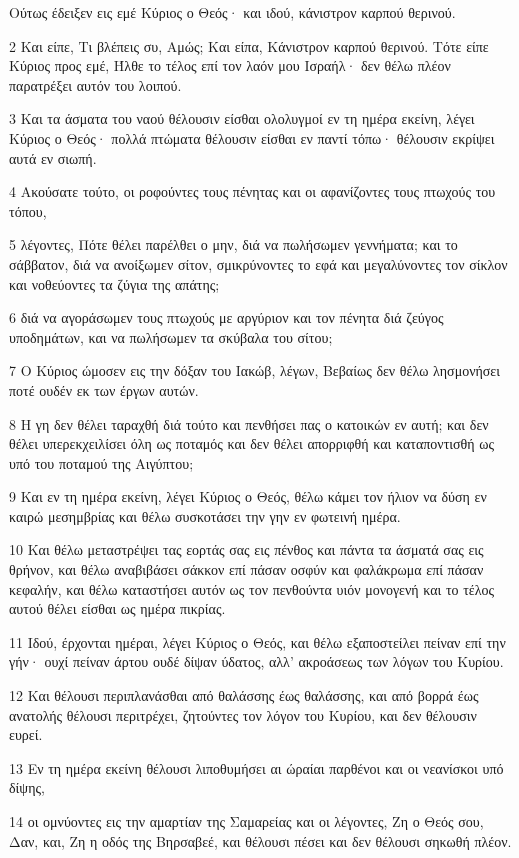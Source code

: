 \par Ούτως έδειξεν εις εμέ Κύριος ο Θεός· και ιδού, κάνιστρον καρπού θερινού.
\par 2 Και είπε, Τι βλέπεις συ, Αμώς; Και είπα, Κάνιστρον καρπού θερινού. Τότε είπε Κύριος προς εμέ, Ήλθε το τέλος επί τον λαόν μου Ισραήλ· δεν θέλω πλέον παρατρέξει αυτόν του λοιπού.
\par 3 Και τα άσματα του ναού θέλουσιν είσθαι ολολυγμοί εν τη ημέρα εκείνη, λέγει Κύριος ο Θεός· πολλά πτώματα θέλουσιν είσθαι εν παντί τόπω· θέλουσιν εκρίψει αυτά εν σιωπή.
\par 4 Ακούσατε τούτο, οι ροφούντες τους πένητας και οι αφανίζοντες τους πτωχούς του τόπου,
\par 5 λέγοντες, Πότε θέλει παρέλθει ο μην, διά να πωλήσωμεν γεννήματα; και το σάββατον, διά να ανοίξωμεν σίτον, σμικρύνοντες το εφά και μεγαλύνοντες τον σίκλον και νοθεύοντες τα ζύγια της απάτης;
\par 6 διά να αγοράσωμεν τους πτωχούς με αργύριον και τον πένητα διά ζεύγος υποδημάτων, και να πωλήσωμεν τα σκύβαλα του σίτου;
\par 7 Ο Κύριος ώμοσεν εις την δόξαν του Ιακώβ, λέγων, Βεβαίως δεν θέλω λησμονήσει ποτέ ουδέν εκ των έργων αυτών.
\par 8 Η γη δεν θέλει ταραχθή διά τούτο και πενθήσει πας ο κατοικών εν αυτή; και δεν θέλει υπερεκχειλίσει όλη ως ποταμός και δεν θέλει απορριφθή και καταποντισθή ως υπό του ποταμού της Αιγύπτου;
\par 9 Και εν τη ημέρα εκείνη, λέγει Κύριος ο Θεός, θέλω κάμει τον ήλιον να δύση εν καιρώ μεσημβρίας και θέλω συσκοτάσει την γην εν φωτεινή ημέρα.
\par 10 Και θέλω μεταστρέψει τας εορτάς σας εις πένθος και πάντα τα άσματά σας εις θρήνον, και θέλω αναβιβάσει σάκκον επί πάσαν οσφύν και φαλάκρωμα επί πάσαν κεφαλήν, και θέλω καταστήσει αυτόν ως τον πενθούντα υιόν μονογενή και το τέλος αυτού θέλει είσθαι ως ημέρα πικρίας.
\par 11 Ιδού, έρχονται ημέραι, λέγει Κύριος ο Θεός, και θέλω εξαποστείλει πείναν επί την γήν· ουχί πείναν άρτου ουδέ δίψαν ύδατος, αλλ' ακροάσεως των λόγων του Κυρίου.
\par 12 Και θέλουσι περιπλανάσθαι από θαλάσσης έως θαλάσσης, και από βορρά έως ανατολής θέλουσι περιτρέχει, ζητούντες τον λόγον του Κυρίου, και δεν θέλουσιν ευρεί.
\par 13 Εν τη ημέρα εκείνη θέλουσι λιποθυμήσει αι ώραίαι παρθένοι και οι νεανίσκοι υπό δίψης,
\par 14 οι ομνύοντες εις την αμαρτίαν της Σαμαρείας και οι λέγοντες, Ζη ο Θεός σου, Δαν, και, Ζη η οδός της Βηρσαβεέ, και θέλουσι πέσει και δεν θέλουσι σηκωθή πλέον.

